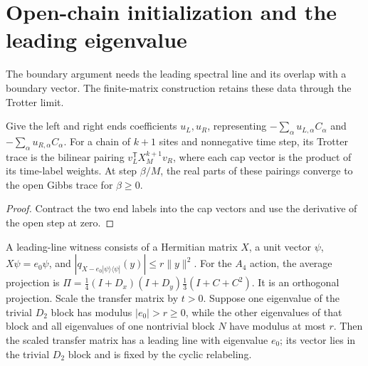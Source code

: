 \section{Open-chain initialization and the leading eigenvalue}

The boundary argument needs the leading spectral line and its overlap with a boundary vector.
The finite-matrix construction retains these data through the Trotter limit.

\begin{lemma}
  \label{lem:single-site-open}
  \leanok
  Give the left and right ends coefficients \(u_L,u_R\), representing
  \(-\sum_\alpha u_{L,\alpha}C_\alpha\) and
  \(-\sum_\alpha u_{R,\alpha}C_\alpha\).
  For a chain of \(k+1\) sites and nonnegative time step, its Trotter trace is the bilinear
  pairing \(v_L^{\mathsf T}X_M^{k+1}v_R\), where each cap vector is the product of its
  time-label weights. At step \(\beta/M\), the real parts of these pairings converge to the open
  Gibbs trace
  for \(\beta\ge0\).
\end{lemma}
\begin{proof}
  \leanok
  Contract the two end labels into the cap vectors and use the derivative of the open step
  at zero.
\end{proof}

\begin{definition}
  \label{def:leading-line}
  \leanok
  A leading-line witness consists of a Hermitian matrix \(X\), a unit vector \(\psi\),
  \(X\psi=e_0\psi\), and
  \(|q_{X-e_0|\psi\rangle\langle\psi|}(y)|\le r\|y\|^2\).
  For the \(A_4\) action, the average projection is
  \(\Pi=\tfrac14(I+D_x)(I+D_y)\tfrac13(I+C+C^2)\).
  It is an orthogonal projection. Scale the transfer matrix by \(t>0\). Suppose one eigenvalue
  of the trivial \(D_2\) block has modulus \(|e_0|>r\ge0\), while the other eigenvalues of that
  block and all eigenvalues of one nontrivial block \(N\) have modulus at most \(r\).
  Then the scaled transfer matrix has a leading line with eigenvalue \(e_0\); its vector lies in
  the trivial \(D_2\) block and is fixed by the cyclic relabeling.
\end{definition}


